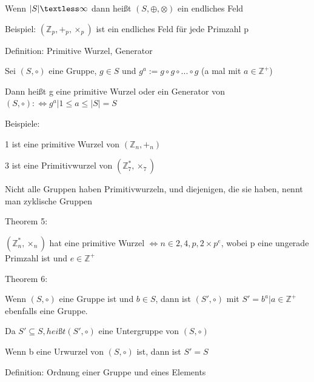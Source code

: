 \documentclass[a4paper]{article}
\begin{document}
\begin{multicols}{3}
\begin{itemize*}
\begin{itemize*}
                  \item Wenn $| S|\textless\infty$ dann heißt $(S,\oplus,\otimes)$ ein endliches Feld
            \end{itemize*}
            \item Beispiel: $(\mathbb{Z}_p, +_p,
                  \times_p)$ ist ein endliches Feld für jede Primzahl p
            \item Definition: Primitive Wurzel, Generator
            \begin{itemize*}
                  \item Sei $(S,\circ)$ eine Gruppe, $g\in S$ und $g^a:=g\circ g\circ...\circ g$ (a mal mit $a\in\mathbb{Z}^+$)
                  \item Dann heißt g eine primitive Wurzel oder ein Generator von $(S,\circ):\Leftrightarrow{g^a|1\leq a\leq | S|}=S$
                  \item Beispiele:
                  \begin{itemize*} \item 1 ist eine primitive Wurzel von $(\mathbb{Z}_n, +_n)$ \item 3 ist eine Primitivwurzel von $(\mathbb{Z}^*_7, \times_7)$ \end{itemize*}
                  \item Nicht alle Gruppen haben Primitivwurzeln, und diejenigen, die sie haben, nennt man zyklische Gruppen
            \end{itemize*}
            \item Theorem 5:
            \begin{itemize*}
                  \item $(\mathbb{Z}^*_n, \times_n)$ hat eine primitive Wurzel $\Leftrightarrow n\in{2,4,p,2\times p^e}$, wobei p eine ungerade Primzahl ist und $e\in\mathbb{Z}^+$
            \end{itemize*}
            \item Theorem 6:
            \begin{itemize*}
                  \item Wenn $(S,\circ)$ eine Gruppe ist und $b\in S$, dann ist $(S',\circ)$ mit $S'={b^a| a\in\mathbb{Z}^+}$ ebenfalls eine Gruppe.
                  \item Da $S'\subseteq S, heißt (S',\circ)$ eine Untergruppe von $(S,\circ)$
                  \item Wenn b eine Urwurzel von $(S,\circ)$ ist, dann ist $S'=S$
            \end{itemize*}
            \item Definition: Ordnung einer Gruppe und eines Elements

\end{itemize*}
\end{multicols}
\end{document}
